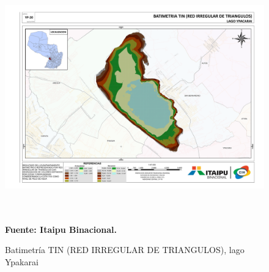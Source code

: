 \begin{appendices}
\begin{figure}[ht]
    \centering
    \includegraphics[width=150mm, height=100mm]{Imagenes/cap3/Batimetria_lago_Ypacarai_TIN_A3.pdf}
    \caption[BATIMETRIA TIN lago Ypakarai]{Batimetr\'ia TIN (RED IRREGULAR DE TRIANGULOS), lago Ypakarai} \textbf{Fuente: Itaipu Binacional.}
    \label{fig:ModuloFrontal}
\end{figure}


\end{appendices}
